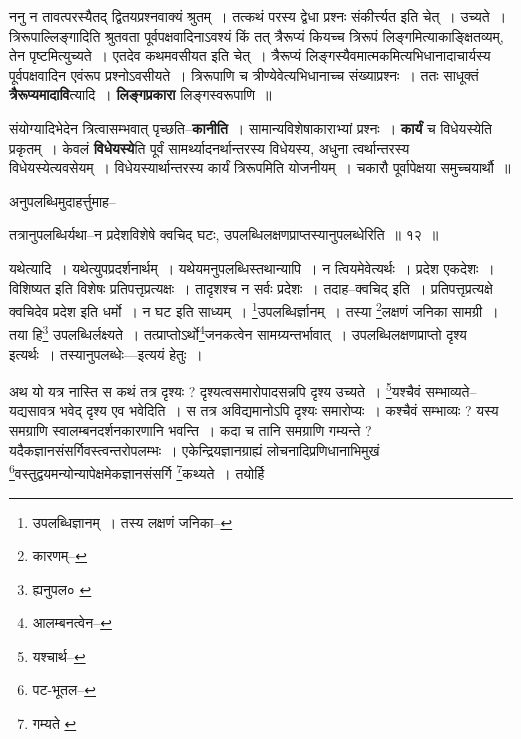 \documentclass[article,12pt,a4paper]{memoir}
\begin{document}
	  \pstart ननु न तावत्परस्यैतद् द्वितयप्रश्नवाक्यं श्रुतम् । तत्कथं परस्य द्वेधा प्रश्नः संकीर्त्त्यत इति चेत् । उच्यते । त्रिरूपाल्लिङ्गादिति श्रुतवता पूर्वपक्षवादिनाऽवश्यं किं तत् त्रैरूप्यं कियच्च त्रिरूपं लिङ्गमित्याकाङ्क्षितव्यम्, तेन पृष्टमित्युच्यते । एतदेव कथमवसीयत इति चेत् । त्रैरूप्यं लिङ्गस्यैवमात्मकमित्यभिधानादाचार्यस्य पूर्वपक्षवादिन एवंरूप प्रश्नोऽवसीयते । त्रिरूपाणि च त्रीण्येवेत्यभिधानाच्च संख्याप्रश्नः । ततः साधूक्तं \textbf{त्रैरूप्यमादावि}त्यादि । \textbf{लिङ्गप्रकारा} लिङ्गस्वरूपाणि ॥
	\pend
      

	  \pstart संयोग्यादिभेदेन त्रित्वासम्भवात् पृच्छति--\textbf{कानीति} । सामान्यविशेषाकाराभ्यां प्रश्नः । \textbf{कार्यं} च विधेयस्येति प्रकृतम् । केवलं \textbf{विधेयस्ये}ति पूर्वं सामर्थ्यादनर्थान्तरस्य विधेयस्य, अधुना त्वर्थान्तरस्य विधेयस्येत्यवसेयम् । विधेयस्यार्थान्तरस्य कार्यं त्रिरूपमिति योजनीयम् । चकारौ पूर्वापेक्षया समुच्चयार्थौ ॥
	\pend
	  \bigskip
	  \begingroup
	

	  \pstart अनुपलब्धिमुदाहर्त्तुमाह--
	\pend
       
	  \bigskip
	  \begingroup
	

	  \pstart तत्रानुपलब्धिर्यथा--न प्रदेशविशेषे क्वचिद् घटः, उपलब्धिलक्षणप्राप्तस्यानुपलब्धेरिति ॥ १२ ॥
	\pend
      
	  \endgroup
	 

	  \pstart यथेत्यादि । यथेत्युपप्रदर्शनार्थम् । यथेयमनुपलब्धिस्तथान्यापि । न त्वियमेवेत्यर्थः । प्रदेश एकदेशः । विशिष्यत इति विशेषः प्रतिपत्तृप्रत्यक्षः । तादृशश्च न सर्वः प्रदेशः । तदाह--क्वचिद् इति । प्रतिपत्तृप्रत्यक्षे क्वचिदेव प्रदेश इति धर्मो । न घट इति साध्यम् । \footnote{उपलब्धिज्ञानम् । तस्य लक्षणं जनिका--\cite{dp-msA}}\-उपलब्धिर्ज्ञानम् । तस्या \footnote{कारणम्--\cite{dp-msD-n}}\-लक्षणं जनिका सामग्री । तया हि\footnote{ह्यनुपल० \cite{dp-edH}} उपलब्धिर्लक्ष्यते । तत्प्राप्तोऽर्थो\footnote{आलम्बनत्वेन--\cite{dp-msD-n}}\-जनकत्वेन सामग्र्यन्तर्भावात् । उपलब्धिलक्षणप्राप्तो दृश्य इत्यर्थः । तस्यानुपलब्धेः—इत्ययं हेतुः ।
	\pend
       

	  \pstart अथ यो यत्र नास्ति स कथं तत्र दृश्यः ? दृश्यत्वसमारोपादसन्नपि दृश्य उच्यते । \footnote{यश्चार्थ--\cite{dp-msD-n}}\-यश्चैवं सम्भाव्यते--यद्यसावत्र भवेद् दृश्य एव भवेदिति । स तत्र अविद्यमानोऽपि दृश्यः समारोप्यः । कश्चैवं सम्भाव्यः ? यस्य समग्राणि स्वालम्बनदर्शनकारणानि भवन्ति । कदा च तानि समग्राणि गम्यन्ते ? यदैकज्ञानसंसर्गिवस्त्वन्तरोपलम्भः । एकेन्द्रियज्ञानग्राह्यं लोचनादिप्रणिधानाभिमुखं \footnote{पट-भूतल--\cite{dp-msD-n}}\-वस्तुद्वयमन्योन्यापेक्षमेकज्ञानसंसर्गि \footnote{गम्यते \cite{dp-msB}}\-कथ्यते । तयोर्हि
	\pend
      
\end{document}
